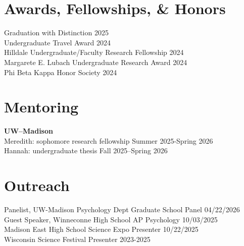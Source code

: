 \documentclass[10pt]{article}
\begin{document}
\section*{Awards, Fellowships, \& Honors}
Graduation with Distinction \hfill 2025 \\
Undergraduate Travel Award \hfill 2024 \\
Hilldale Undergraduate/Faculty Research Fellowship \hfill 2024 \\
Margarete E. Lubach Undergraduate Research Award \hfill 2024 \\
Phi Beta Kappa Honor Society \hfill 2024
\section*{Mentoring}
\textbf{UW–Madison} \\
Meredith: sophomore research fellowship \hfill Summer 2025-Spring 2026 \\
Hannah: undergraduate thesis \hfill Fall 2025–Spring 2026
\section*{Outreach}
Panelist, UW-Madison Psychology Dept Graduate School Panel \hfill 04/22/2026 \\
Guest Speaker, Winneconne High School AP Psychology \hfill 10/03/2025 \\
Madison East High School Science Expo Presenter \hfill 10/22/2025 \\
Wisconsin Science Festival Presenter \hfill 2023-2025
\end{document}
